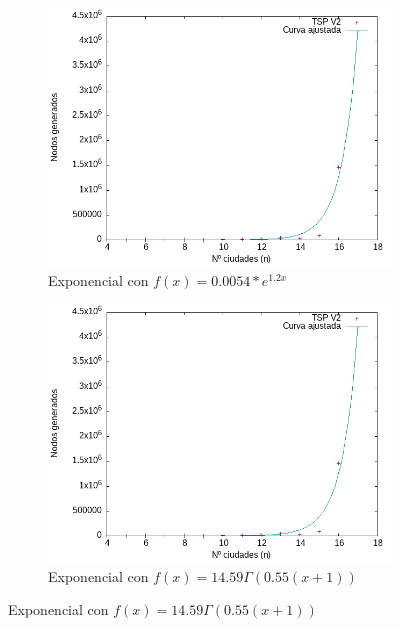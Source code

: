 \documentclass{article}
\begin{document}
\begin{figure}[H]
    \centering
    \begin{subfigure}[b]{0.45\textwidth}
        \centering
        \includegraphics[width=\textwidth]{imagenes/Data/CurvaAjustada.png}
        \caption{Exponencial con $f(x)=0.0054*e^{1.2x}$}
    \end{subfigure}
    \begin{subfigure}[b]{0.45\textwidth}
        \centering
        \includegraphics[width=\textwidth]{imagenes/Data/CurvaAjustadaFactorial.png}
        \caption{Exponencial con $f(x)=14.59 \Gamma(0.55(x+1)) $}
    \end{subfigure}
\end{figure}
\end{document}
